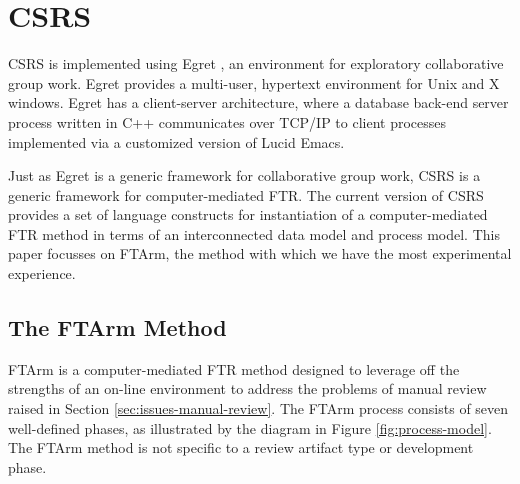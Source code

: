 


\section{CSRS}
\label{sec:csrs}

CSRS is implemented using Egret \cite{csdl-92-01}, an environment for
exploratory collaborative group work. Egret provides a multi-user,
hypertext environment for Unix and X windows.  Egret has a client-server
architecture, where a database back-end server process written in C++
communicates over TCP/IP to client processes implemented via a customized
version of Lucid Emacs.

Just as Egret is a generic framework for collaborative group work, CSRS is
a generic framework for computer-mediated FTR.  The current version of CSRS
provides a set of language constructs for instantiation of a
computer-mediated FTR method in terms of an interconnected data model and
process model.  This paper focusses on FTArm, the method with which we have
the most experimental experience.


\begin{figure*} [t]
 {\centerline{}}
\caption{{\em The seven phases in the FTArm method, along with the primary
entry condition for each phase.}}
\label{fig:process-model}
\end{figure*}

\subsection{The FTArm Method}

FTArm is a computer-mediated FTR method designed to leverage off the
strengths of an on-line environment to address the problems of manual
review raised in Section \ref{sec:issues-manual-review}.  The FTArm process
consists of seven well-defined phases, as illustrated by the diagram in
Figure \ref{fig:process-model}. The FTArm method is not specific to a
review artifact type or development phase.


